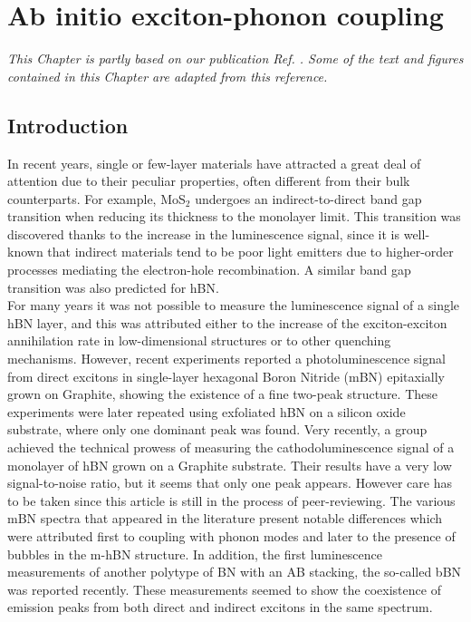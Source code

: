 \chapter{Ab initio exciton-phonon coupling} \label{chap:mBN}
\textit{This Chapter is partly based on our publication Ref. \cite{lechifflart2023first}. Some of the text and figures contained in this Chapter are adapted from this reference.}


\chaptertoc{}

%
\section{Introduction}
In recent years, single or few-layer materials have attracted a great deal of attention due to their peculiar properties, often different from their bulk counterparts. For example, MoS$_2$ undergoes an indirect-to-direct band gap transition when reducing its thickness to the monolayer limit.\cite{splendiani2010emerging,Mak_2010}
This transition was discovered thanks to the increase in the luminescence signal, since it is well-known that indirect materials tend to be poor light emitters due to higher-order processes mediating the electron-hole recombination.
A similar band gap transition was also predicted for \acrshort{hBN}.\cite{paleari2018excitons}\\

For many years it was not possible to measure the luminescence signal of a single hBN layer,\cite{schue2016dimensionality} and this was attributed either to the increase of the exciton-exciton annihilation rate in low-dimensional structures\cite{yuan2015exciton,plaud2019exciton} or to other quenching mechanisms.
However, recent experiments reported a photoluminescence signal from direct excitons in single-layer hexagonal Boron Nitride (mBN) epitaxially grown on Graphite, showing the existence of a fine two-peak structure.\cite{elias2019direct,wang2022scalable} These experiments were later repeated using exfoliated hBN on a silicon oxide substrate,\cite{rousseau2021monolayer} where only one dominant peak was found. Very recently, a group achieved the technical prowess of measuring the cathodoluminescence signal of a monolayer of hBN grown on a Graphite substrate.\cite{shima2023cathodoluminescence} Their results have a very low signal-to-noise ratio, but it seems that only one peak appears. However care has to be taken since this article is still in the process of peer-reviewing.
The various mBN spectra that appeared in the literature present notable differences which were attributed first to coupling with phonon modes and later to the presence of bubbles in the m-hBN structure.
In addition, the first luminescence measurements of another polytype of BN with an AB stacking, the so-called \acrfull{bBN} was reported recently.\cite{rousseau2022bernal, rousseau2022phonon}
These measurements seemed to show the coexistence of emission peaks from both direct and indirect excitons in the same spectrum. \\

